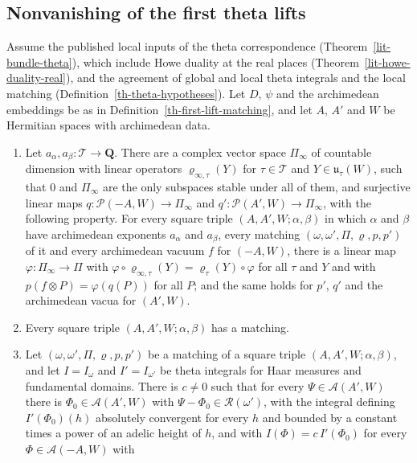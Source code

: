 \subsection{Nonvanishing of the first theta lifts}\label{subsection-th-first-lifts}

\begin{lemma}\label{th-first-lift-inputs}
Assume the published local inputs of the theta correspondence
(Theorem~\ref{lit-bundle-theta}), which include Howe duality at the real places
(Theorem~\ref{lit-howe-duality-real}), and the agreement of global and local
theta integrals and the local matching (Definition~\ref{th-theta-hypotheses}).
Let $D$, $\psi$ and the archimedean embeddings be as in
Definition~\ref{th-first-lift-matching}, and let $A$, $A'$ and $W$ be Hermitian
spaces with archimedean data.
\begin{enumerate}
\item Let $a_\alpha,a_\beta\colon\mathcal T\to\mathbf Q$. There are a complex
  vector space $\Pi_\infty$ of countable dimension with linear operators
  $\varrho_{\infty,\tau}(Y)$ for $\tau\in\mathcal T$ and
  $Y\in\mathfrak u_\tau(W)$, such that $0$ and $\Pi_\infty$ are the only
  subspaces stable under all of them, and surjective linear maps
  $q\colon\mathcal P(-A,W)\to\Pi_\infty$ and
  $q'\colon\mathcal P(A',W)\to\Pi_\infty$, with the following property. For
  every square triple $(A,A',W;\alpha,\beta)$ in which $\alpha$ and $\beta$
  have archimedean exponents $a_\alpha$ and $a_\beta$, every matching
  $(\omega,\omega',\Pi,\varrho,p,p')$ of it and every archimedean vacuum $f$ for
  $(-A,W)$, there is a linear map $\varphi\colon\Pi_\infty\to\Pi$ with
  $\varphi\circ\varrho_{\infty,\tau}(Y)=\varrho_\tau(Y)\circ\varphi$ for all
  $\tau$ and $Y$ and with $p(f\otimes P)=\varphi(q(P))$ for all $P$; and the same
  holds for $p'$, $q'$ and the archimedean vacua for $(A',W)$.
\item Every square triple $(A,A',W;\alpha,\beta)$ has a matching.
\item Let $(\omega,\omega',\Pi,\varrho,p,p')$ be a matching of a square triple
  $(A,A',W;\alpha,\beta)$, and let $I=I_\omega$ and $I'=I_{\omega'}$ be theta
  integrals for Haar measures and fundamental domains. There is $c\neq0$ such
  that for every $\Psi\in\mathcal A(A',W)$ there is
  $\Phi_0\in\mathcal A(A',W)$ with $\Psi-\Phi_0\in\mathcal R(\omega')$, with
  the integral defining $I'(\Phi_0)(h)$ absolutely convergent for every $h$ and
  bounded by a constant times a power of an adelic height of $h$, and with
  $I(\Phi)=c\,I'(\Phi_0)$ for every $\Phi\in\mathcal A(-A,W)$ with

\end{enumerate}
\end{lemma}
